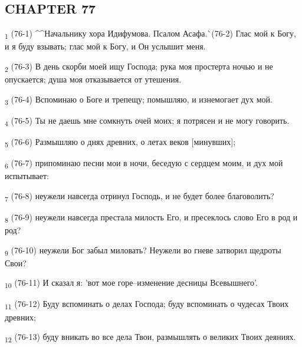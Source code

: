 \subsection{CHAPTER 77}
\begin{tcolorbox}
\textsubscript{1} (76-1) ^^Начальнику хора Идифумова. Псалом Асафа.^^ (76-2) Глас мой к Богу, и я буду взывать; глас мой к Богу, и Он услышит меня.
\end{tcolorbox}
\begin{tcolorbox}
\textsubscript{2} (76-3) В день скорби моей ищу Господа; рука моя простерта ночью и не опускается; душа моя отказывается от утешения.
\end{tcolorbox}
\begin{tcolorbox}
\textsubscript{3} (76-4) Вспоминаю о Боге и трепещу; помышляю, и изнемогает дух мой.
\end{tcolorbox}
\begin{tcolorbox}
\textsubscript{4} (76-5) Ты не даешь мне сомкнуть очей моих; я потрясен и не могу говорить.
\end{tcolorbox}
\begin{tcolorbox}
\textsubscript{5} (76-6) Размышляю о днях древних, о летах веков [минувших];
\end{tcolorbox}
\begin{tcolorbox}
\textsubscript{6} (76-7) припоминаю песни мои в ночи, беседую с сердцем моим, и дух мой испытывает:
\end{tcolorbox}
\begin{tcolorbox}
\textsubscript{7} (76-8) неужели навсегда отринул Господь, и не будет более благоволить?
\end{tcolorbox}
\begin{tcolorbox}
\textsubscript{8} (76-9) неужели навсегда престала милость Его, и пресеклось слово Его в род и род?
\end{tcolorbox}
\begin{tcolorbox}
\textsubscript{9} (76-10) неужели Бог забыл миловать? Неужели во гневе затворил щедроты Свои?
\end{tcolorbox}
\begin{tcolorbox}
\textsubscript{10} (76-11) И сказал я: 'вот мое горе--изменение десницы Всевышнего'.
\end{tcolorbox}
\begin{tcolorbox}
\textsubscript{11} (76-12) Буду вспоминать о делах Господа; буду вспоминать о чудесах Твоих древних;
\end{tcolorbox}
\begin{tcolorbox}
\textsubscript{12} (76-13) буду вникать во все дела Твои, размышлять о великих Твоих деяниях.
\end{tcolorbox}
